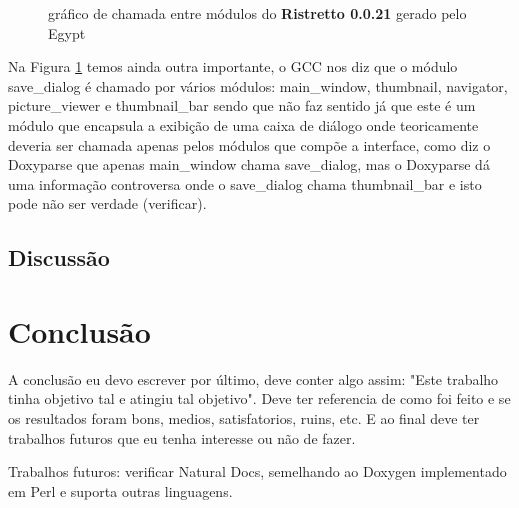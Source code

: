 \begin{figure}
\caption{gráfico de chamada entre módulos do {\bf Ristretto 0.0.21} gerado pelo Egypt}
\label{ristretto-0.0.21}
\end{figure}

Na Figura \ref{ristretto-0.0.21} temos ainda outra importante, o GCC nos diz que o módulo save\_dialog é chamado por vários módulos: main\_window, thumbnail, navigator, picture\_viewer e thumbnail\_bar sendo que não faz sentido já que este é um módulo que encapsula a exibição de uma caixa de diálogo onde teoricamente deveria ser chamada apenas pelos módulos que compõe a interface, como diz o Doxyparse que apenas main\_window chama save\_dialog, mas o Doxyparse dá uma informação controversa onde o save\_dialog chama thumbnail\_bar e isto pode não ser verdade (verificar).

\section{Discussão}

\chapter{Conclusão}

A conclusão eu devo escrever por último, deve conter algo assim: "Este trabalho tinha objetivo tal e atingiu tal objetivo". Deve ter referencia de como foi feito e se os resultados foram bons, medios, satisfatorios, ruins, etc. E ao final deve ter trabalhos futuros que eu tenha interesse ou não de fazer.

Trabalhos futuros: verificar Natural Docs, semelhando ao Doxygen implementado em Perl e suporta outras linguagens.
